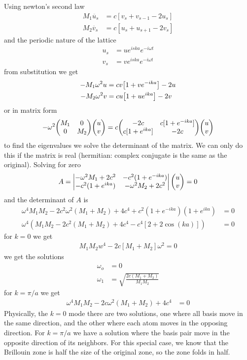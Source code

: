 \documentclass[../main.tex]{subfiles}
\begin{document}
Using newton's second law
\begin{align*}
    M_1 \ddot{u_s} &= c [v_s + v_{s-1} - 2u_s] \\
    M_2 \ddot{v_s} &= c [u_s + u_{s+1} - 2v_s]
\end{align*}
and the periodic nature of the lattice
\begin{align*}
    u_s &= u e^{iska} e^{-i\omega t} \\
    v_s &= v e^{iska} e^{-i\omega t}
\end{align*}
from substitution we get
\begin{align*}
    -M_1 \omega^2 u &= cv \qt[1 + v e^{-ika}] - 2u \\
    -M_2 \omega^2 v &= cu \qt[1 + u e^{ika}] - 2v
\end{align*}
or in matrix form
\begin{align}
    -\omega^2 \mqty(M_1 & 0 \\ 0 & M_2) \mqty(u \\ v) 
    = c \mqty(-2c & c[1 + e^{-ika}] \\ c[1 + e^{ika}] & -2c) \mqty(u \\ v)
\end{align}
to find the eigenvalues we solve the determinant of the matrix. We can only do this if the matrix is
real (hermitian: complex conjugate is the same as the original). Solving for zero
\begin{align*}
    A = \begin{vmatrix}
        -\omega^2 M_1 + 2c^2 & -c^2(1 + e^{-ika}) \\
        -c^2(1 + e^{ika}) & -\omega^2 M_2 + 2c^2
    \end{vmatrix} \mqty(u \\ v)= 0
\end{align*}
and the determinant of $A$ is
\begin{align*}
    \omega^4 M_1 M_2 - 2c^2 \omega^2 (M_1 + M_2) + 4c^4 + c^2(1 + e^{-ika})(1 + e^{ika}) &= 0 \\
    \omega^4 (M_1 M_2 - 2c^2 (M_1 + M_2) + 4c^4 - c^4[2 + 2 \cos(ka)]) &= 0
\end{align*}
for $k = 0$ we get
\begin{align*}
    M_1 M_2 w^4 - 2c[M_1 + M_2]\omega^2 = 0
\end{align*}
we get the solutions
\begin{align*}
    \omega_o &= 0 \\
    \omega_1 &= \sqrt{\frac{2c(M_1 + M_2)}{M_1 M_2}}
\end{align*}
for $k = \pi/a$ we get
\begin{align*}
    \omega^4 M_1 M_2 - 2c \omega^2(M_1 + M_2) + 4c^4 &= 0
\end{align*}
Physically, the $k=0$ mode there are two solutions, one where all basis move in the same direction,
and the other where each atom moves in the opposing direction. For $k = \pi/a$ we have a solution
where the basis pair move in the opposite direction of its neighbors. For this special case, we know
that the Brillouin zone is half the size of the original zone, so the zone folds in half. 
\end{document}
